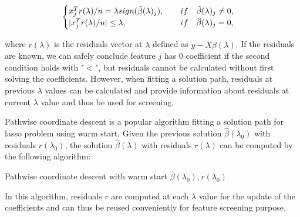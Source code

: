 \documentclass{article}
\begin{document}
\begin{equation}
    \begin{cases}
    x_j^Tr(\lambda)/n = \lambda sign(\hat{\beta}(\lambda)_j),\qquad if\quad \hat{\beta}(\lambda)_j\neq 0,\\
    |x_j^Tr(\lambda)/n| \leq \lambda,\hfill if\quad \hat{\beta}(\lambda)_j= 0,
    \end{cases}
\end{equation}

where $r(\lambda)$ is the residuals vector at $\lambda$ defined as $y-X\hat{\beta}(\lambda)$. If the residuals are known, we can safely conclude feature $j$ has 0 coefficient if the second condition holds with "$<$", but residuals cannot be calculated without first solving the coefficients. However, when fitting a solution path, residuals at previous $\lambda$ values can be calculated and provide information about residuals at current $\lambda$ value and thus be used for screening.

Pathwise coordinate descent is a popular algorithm fitting a solution path for lasso problem using warm start. Given the previous solution $\hat{\beta}(\lambda_0)$ with residuals $r(\lambda_0)$, the solution $\hat{\beta}(\lambda)$ with residuals $r(\lambda)$ can be computed by the following algorithm:

\begin{algorithm}[H]
    \SetAlgoLined
    \BlankLine
    \caption{Pathwise coordinate descent with warm start $\hat{\beta}(\lambda_0),r(\lambda_0)$}
\end{algorithm}

\noindent In this algorithm, residuals $r$ are computed at each $\lambda$ value for the update of the coefficients and can thus be reused conveniently for feature screening purpose.
\end{document}
